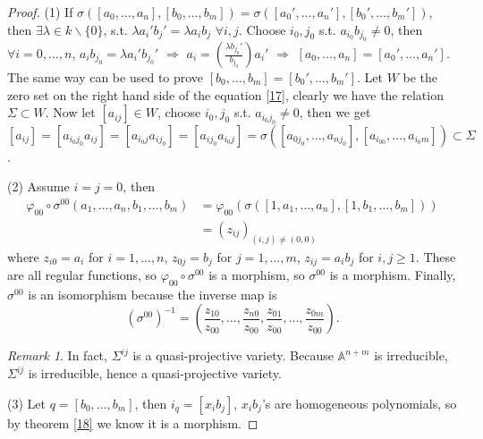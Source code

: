 \documentclass{amsart}
\theoremstyle{plain}
\theoremstyle{definition}
\theoremstyle{remark}
\newtheorem*{remark}{Remark}
\numberwithin{equation}{section}
\begin{document}
\begin{proof}
	(1) If $ \sigma\left( \left[a_0,\dots,a_n\right],\left[b_0,\dots,b_m\right] \right)=\sigma\left( \left[ a_0',\dots,a_n' \right],\left[ b_0',\dots,b_m' \right] \right) $, then $ \exists \lambda\in k\backslash \{ 0 \} $, s.t. $ \lambda a_i'b_j'=\lambda a_ib_j $ $ \forall i,j $. Choose $ i_0,j_0 $ s.t. $ a_{i_0}b_{j_0}\neq 0 $, then $ \forall i=0,\dots,n $, $ a_ib_{j_0}=\lambda a_i'b_{j_0}' $ $ \Rightarrow $ $ a_i=\left(\frac{\lambda b_{j_0}'}{b_{j_0}}\right)a_i' $ $ \Rightarrow $ $ [a_0,\dots,a_n]=[a_0',\dots,a_n'] $. The same way can be used to prove $ [b_0,\dots,b_m]=[b_0',\dots,b_m'] $. Let $ W $ be the zero set on the right hand side of the equation \ref{17}, clearly we have the relation $ \Sigma\subset W $. Now let $ [a_{ij}]\in W $, choose $ i_0,j_0 $ s.t. $ a_{i_0j_0}\neq 0 $, then we get $ [a_{ij}]=[a_{i_0j_0}a_{ij}]=[a_{i_0j}a_{ij_0}]=[a_{ij_0}a_{i_0j}]=\sigma([a_{0j_0},\dots,a_{nj_0}],[a_{i_00},\dots,a_{i_0m}])\subset \Sigma $.
	
	(2) Assume $ i=j=0 $, then  
	\begin{align*}
		\varphi_{00}\circ\sigma^{00}(a_1,\dots,a_n,b_1,\dots,b_m) & =\varphi_{00}(\sigma([1,a_1,\dots,a_n],[1,b_1,\dots,b_m]))\\
		& =(z_{ij})_{(i,j)\neq(0,0)} 
	\end{align*}
	where $ z_{i0}=a_i $ for $ i=1,\dots,n $, $ z_{0j}=b_j $ for $ j=1,\dots,m $, $ z_{ij}=a_ib_j $ for $ i,j\geq 1 $. These are all regular functions, so  $ \varphi_{00}\circ \sigma^{00} $ is a morphism, so $ \sigma^{00} $ is a morphism. Finally, $ \sigma^{00} $ is an isomorphism because the inverse map is 
	\begin{equation*}
	(\sigma^{00})^{-1}=\left(\frac{z_{10}}{z_{00}},\dots,\frac{z_{n0}}{z_{00}},\frac{z_{01}}{z_{00}},\dots,\frac{z_{0m}}{z_{00}}\right).
	\end{equation*}
	\begin{remark}
		In fact,  $ \Sigma^{ij} $ is a quasi-projective  variety. Because $ \mathbb{A}^{n+m} $ is irreducible, $ \Sigma^{ij} $ is irreducible, hence a quasi-projective variety. 
	\end{remark}
	
	(3) Let $ q=[b_0,\dots,b_m] $, then $ i_{q}=[x_ib_j] $, $ x_ib_j $'s are homogeneous polynomials, so by theorem \ref{18} we know it is a morphism.
	

\end{proof}
\end{document}
